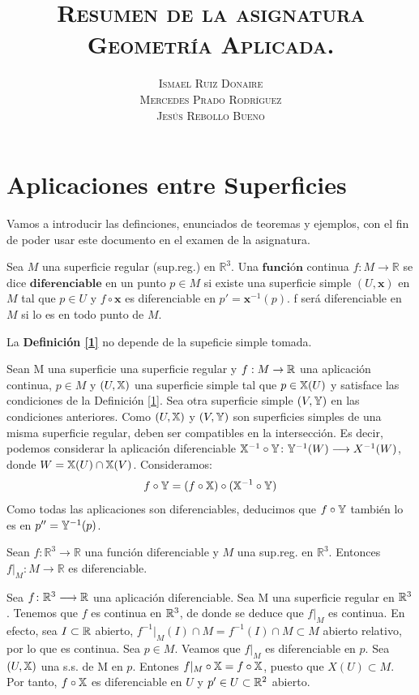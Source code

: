 \documentclass[twoside]{report}
\title{\textsc{Resumen de la asignatura\\ Geometría Aplicada.}}
\author{\textsc{Ismael Ruiz Donaire}\\ \textsc{Mercedes Prado Rodríguez}\\ \textsc{Jesús Rebollo Bueno}}
\date{}
\begin{document}
\maketitle{}




\chapter{Aplicaciones entre Superficies}

Vamos a introducir las definciones, enunciados de teoremas y ejemplos, con el fin de poder usar este documento en el examen de la asignatura.

\begin{defi}\label{1}
Sea $M$ una superficie regular (sup.reg.) en $\mathbb{R}^3$. Una $\textbf{función}$ continua $f: M \rightarrow \mathbb{R}$ se dice $\textbf{diferenciable}$ en un punto $p \in M$ si existe una superficie simple $(U,\textbf{x})$ en $M$ tal que  $p \in U$ y $ f\circ \textbf{x}$ es diferenciable en $p' = \textbf{x}^{-1}(p)$. f será diferenciable en $M$ si lo es en todo punto de $M$.
\end{defi}

\begin{prop}
La \textup{\textbf{Definición \ref{1}}} no depende de la supeficie simple tomada.
\end{prop}
\begin{dem}
Sean M una superficie una superficie regular y $f:M\to\mathbb{R}$ una aplicación continua, $p\in M$ y $(U,\mathbb{X})$ una superficie simple tal que $p \in \mathbb{X}(U)$ y satisface las condiciones de la Definición \ref{1}. Sea otra superficie simple $(V,\mathbb{Y})$ en las condiciones anteriores. Como $(U,\mathbb{X})$ y $(V,\mathbb{Y})$ son superficies simples de una misma superficie regular, deben ser compatibles en la intersección. Es decir, podemos considerar la aplicación diferenciable $\mathbb{X}^{-1}\circ \mathbb{Y} \colon{\mathbb{Y}^{-1}(W)}\longrightarrow{X^{-1}(W)}$, donde $W=\mathbb{X}(U)\cap\mathbb{X}(V)$. Consideramos:
\[
f\circ \mathbb{Y} = (f \circ \mathbb{X})\circ (\mathbb{X}^{-1}\circ \mathbb{Y})
\]
Como todas las aplicaciones son diferenciables, deducimos que $f\circ \mathbb{Y}$ también lo es en $p''=\mathbb{Y}^{-1}(p)$. 

\QED
\end{dem}

\begin{prop}\label{3}
Sean $f: \mathbb{R}^3 \rightarrow \mathbb{R}$ una función diferenciable y $M$ una sup.reg. en $\mathbb{R}^3$. Entonces $f\vert_M : M \rightarrow \mathbb{R}$ es diferenciable.
\end{prop}
\begin{dem} Sea $f\colon{\mathbb{R}^3}\longrightarrow{\mathbb{R}}$ una aplicación diferenciable. Sea M una superficie regular en $\mathbb{R}^3$. Tenemos que $f$ es continua en $\mathbb{R}^3$, de donde se deduce que $f|_M$ es continua. En efecto, sea $I\subset \mathbb{R}$ abierto, $f^{-1}|_M(I)\cap M = f^{-1}(I)\cap M  \subset M$ abierto relativo, por lo que es continua. Sea $p\in M$. Veamos que $f|_M$ es diferenciable en $p$. Sea $(U,\mathbb{X})$ una s.s. de M en $p$. Entones $f|_M \circ \mathbb{X} = f \circ \mathbb{X}$, puesto que $X(U)\subset M$. Por tanto, $f\circ \mathbb{X}$ es diferenciable en $U$ y $p'\in U \subset \mathbb{R}^2$ abierto.\QED
\end{dem}
\end{document}
